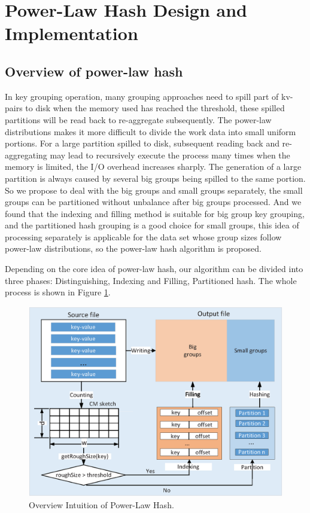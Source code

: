 \section{Power-Law Hash Design and Implementation}
\label{sec:hash}


\subsection{Overview of power-law hash}%
In key grouping operation, many grouping approaches need to spill part of kv-pairs to disk when the memory used has reached the threshold, these spilled partitions will be read back to re-aggregate subsequently. The power-law distributions makes it more difficult to divide the work data into small uniform portions. For a large partition spilled to disk, subsequent reading back and re-aggregating may lead to recursively execute the process many times when the memory is limited, the I/O overhead increases sharply. The generation of a large partition is always caused by several big groups being spilled to the same portion. So we propose to deal with the big groups and small groups separately, the small groups can be partitioned without unbalance after big groups processed. And we found that the indexing and filling method is suitable for big group key grouping, and the partitioned hash grouping is a good choice for small groups, this idea of processing separately is applicable for the data set whose group sizes follow power-law distributions, so the power-law hash algorithm is proposed. 

Depending on the core idea of power-law hash, our algorithm can be divided into three phases: Distinguishing, Indexing and Filling, Partitioned hash. The whole process is shown in Figure \ref{fig:pwHash}.
\begin{figure}
\includegraphics[width=.5\textwidth]{fig/pwhash}
\caption{Overview Intuition of Power-Law Hash.}
\label{fig:pwHash}
\end{figure}

